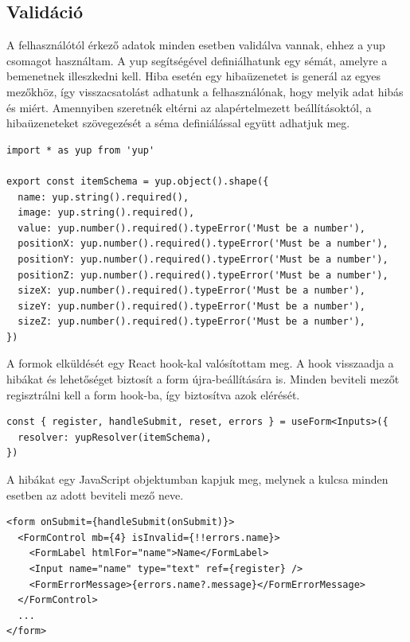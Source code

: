 \subsection{Validáció}
A felhasználótól érkező adatok minden esetben validálva vannak, ehhez a yup csomagot használtam.
A yup segítségével definiálhatunk egy sémát, amelyre a bemenetnek illeszkedni kell. 
Hiba esetén egy hibaüzenetet is generál az egyes mezőkhöz, így visszacsatolást adhatunk a felhasználónak, hogy melyik adat hibás és miért.
Amennyiben szeretnék eltérni az alapértelmezett beállításoktól, a hibaüzeneteket szövegezését a séma definiálással együtt adhatjuk meg.

\begin{lstlisting}[style=ES6, caption={Esköz validációs séma}]
import * as yup from 'yup'

export const itemSchema = yup.object().shape({
  name: yup.string().required(),
  image: yup.string().required(),
  value: yup.number().required().typeError('Must be a number'),
  positionX: yup.number().required().typeError('Must be a number'),
  positionY: yup.number().required().typeError('Must be a number'),
  positionZ: yup.number().required().typeError('Must be a number'),
  sizeX: yup.number().required().typeError('Must be a number'),
  sizeY: yup.number().required().typeError('Must be a number'),
  sizeZ: yup.number().required().typeError('Must be a number'),
})
\end{lstlisting}

A formok elküldését egy React hook-kal valósítottam meg.
A hook visszaadja a hibákat és lehetőséget biztosít a form újra-beállítására is.
Minden beviteli mezőt regisztrálni kell a form hook-ba, így biztosítva azok elérését.

\begin{lstlisting}[style=ES6, caption={Regisztrációnál használt form hook}]
const { register, handleSubmit, reset, errors } = useForm<Inputs>({
  resolver: yupResolver(itemSchema),
})
\end{lstlisting}

A hibákat egy JavaScript objektumban kapjuk meg, melynek a kulcsa minden esetben az adott beviteli mező neve.

\begin{lstlisting}[style=ES6, caption={Form}]
<form onSubmit={handleSubmit(onSubmit)}>
  <FormControl mb={4} isInvalid={!!errors.name}>
    <FormLabel htmlFor="name">Name</FormLabel>
    <Input name="name" type="text" ref={register} />
    <FormErrorMessage>{errors.name?.message}</FormErrorMessage>
  </FormControl>
  ...
</form>
\end{lstlisting}

